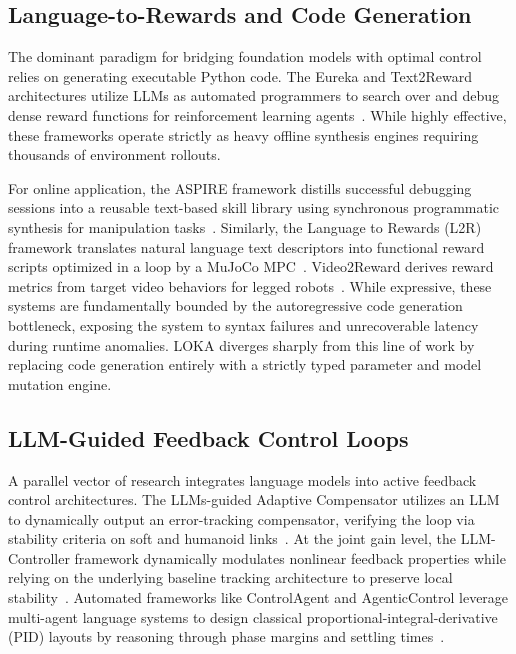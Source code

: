 \subsection{Language-to-Rewards and Code Generation}
\label{sec:related-code}

The dominant paradigm for bridging foundation models with optimal control relies on generating executable Python code.
The Eureka and Text2Reward architectures utilize LLMs as automated programmers to search over and debug dense reward functions for reinforcement learning agents~\cite{Eureka, Text2Reward}.
While highly effective, these frameworks operate strictly as heavy offline synthesis engines requiring thousands of environment rollouts.

For online application, the ASPIRE framework distills successful debugging sessions into a reusable text-based skill library using synchronous programmatic synthesis for manipulation tasks~\cite{ASPIRE}.
Similarly, the Language to Rewards (L2R) framework translates natural language text descriptors into functional reward scripts optimized in a loop by a MuJoCo MPC~\cite{Lang2Reward}.
Video2Reward derives reward metrics from target video behaviors for legged robots~\cite{Video2Reward}.
While expressive, these systems are fundamentally bounded by the autoregressive code generation bottleneck, exposing the system to syntax failures and unrecoverable latency during runtime anomalies.
LOKA diverges sharply from this line of work by replacing code generation entirely with a strictly typed parameter and model mutation engine.

\subsection{LLM-Guided Feedback Control Loops}
\label{sec:related-feedback}

A parallel vector of research integrates language models into active feedback control architectures.
The LLMs-guided Adaptive Compensator utilizes an LLM to dynamically output an error-tracking compensator, verifying the loop via stability criteria on soft and humanoid links~\cite{LLMadaptive}.
At the joint gain level, the LLM-Controller framework dynamically modulates nonlinear feedback properties while relying on the underlying baseline tracking architecture to preserve local stability~\cite{LLMcontroller}.
Automated frameworks like ControlAgent and AgenticControl leverage multi-agent language systems to design classical proportional-integral-derivative (PID) layouts by reasoning through phase margins and settling times~\cite{ControlAgent, AgenticControl}.

